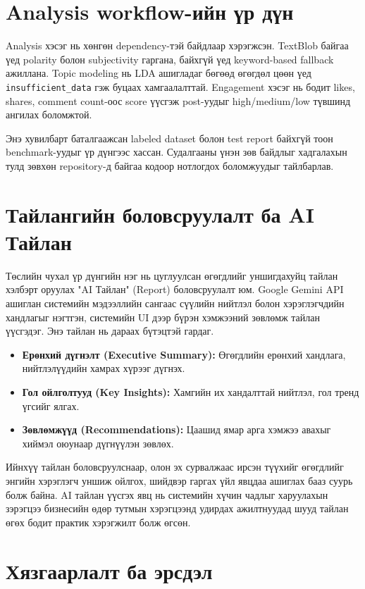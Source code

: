 \documentclass[
12pt,
oneside,
english,
onehalfspacing,
nolistspacing,
headsepline,
]{MUST-Thesis}
\begin{document}
\section{Analysis workflow-ийн үр дүн}

Analysis хэсэг нь хөнгөн dependency-тэй байдлаар хэрэгжсэн. TextBlob байгаа үед polarity болон subjectivity гаргана, байхгүй үед keyword-based fallback ажиллана. Topic modeling нь LDA ашигладаг бөгөөд өгөгдөл цөөн үед \texttt{insufficient\_data} гэж буцаах хамгаалалттай. Engagement хэсэг нь бодит likes, shares, comment count-оос score үүсгэж post-уудыг high/medium/low түвшинд ангилах боломжтой.

Энэ хувилбарт баталгаажсан labeled dataset болон test report байхгүй тоон benchmark-уудыг үр дүнгээс хассан. Судалгааны үнэн зөв байдлыг хадгалахын тулд зөвхөн repository-д байгаа кодоор нотлогдох боломжуудыг тайлбарлав.

\section{Тайлангийн боловсруулалт ба AI Тайлан}

Төслийн чухал үр дүнгийн нэг нь цуглуулсан өгөгдлийг уншигдахуйц тайлан хэлбэрт оруулах "AI Тайлан" (Report) боловсруулалт юм. Google Gemini API ашиглан системийн мэдээллийн сангаас сүүлийн нийтлэл болон хэрэглэгчдийн хандлагыг нэгтгэн, системийн UI дээр бүрэн хэмжээний зөвлөмж тайлан үүсгэдэг. Энэ тайлан нь дараах бүтэцтэй гардаг.

\begin{itemize}
    \item \textbf{Ерөнхий дүгнэлт (Executive Summary):} Өгөгдлийн ерөнхий хандлага, нийтлэлүүдийн хамрах хүрээг дүгнэх.
    \item \textbf{Гол ойлголтууд (Key Insights):} Хамгийн их хандалттай нийтлэл, гол тренд үгсийг ялгах.
    \item \textbf{Зөвлөмжүүд (Recommendations):} Цаашид ямар арга хэмжээ авахыг хиймэл оюунаар дүгнүүлэн зөвлөх.
\end{itemize}

Ийнхүү тайлан боловсруулснаар, олон эх сурвалжаас ирсэн түүхийг өгөгдлийг энгийн хэрэглэгч уншиж ойлгох, шийдвэр гаргах үйл явцдаа ашиглах бааз суурь болж байна. AI тайлан үүсгэх явц нь системийн хүчин чадлыг харуулахын зэрэгцээ бизнесийн өдөр тутмын хэрэгцээнд удирдах ажилтнуудад шууд тайлан өгөх бодит практик хэрэгжилт болж өгсөн.

\section{Хязгаарлалт ба эрсдэл}
\end{document}

